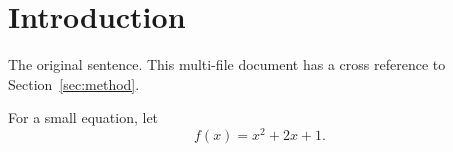 \section{Introduction}\label{sec:introduction}
The original sentence.
This multi-file document has a cross reference to Section~\ref{sec:method}.

For a small equation, let
\[
  f(x) = x^2 + 2x + 1.
\]
